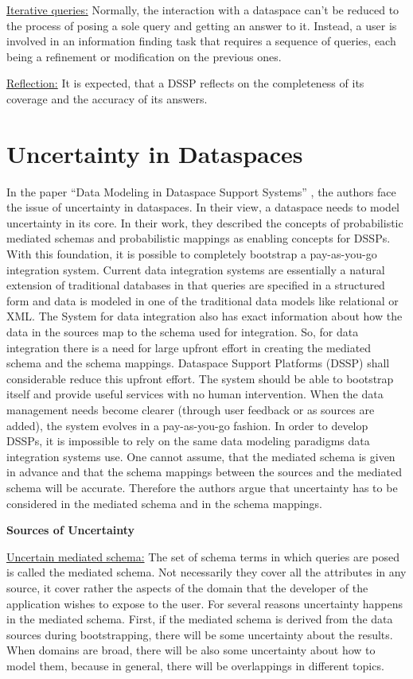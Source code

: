 \uline{Iterative queries:} Normally, the interaction with a dataspace can't be reduced to the process of posing  a sole query and getting an answer to it. Instead, a user is involved in an information finding task that requires a sequence of queries, each being a refinement or modification on the previous ones.

\uline{Reflection:} It is expected, that a DSSP reflects on the completeness of its coverage and the accuracy of its answers. 


\section{Uncertainty in Dataspaces}
 
In the paper ``Data Modeling in Dataspace Support Systems'' \cite{DBLP:conf/birthday/SarmaDH09}, the authors face the issue of uncertainty in dataspaces. In their view, a dataspace needs to model uncertainty in its core. In their work, they described the concepts of probabilistic mediated schemas and probabilistic mappings as enabling concepts for DSSPs. With this foundation, it is possible to completely bootstrap a pay-as-you-go integration system.
Current data integration systems are essentially a natural extension of traditional databases in that queries are specified in a structured form and data is modeled in one of the traditional data models like relational or XML. The System for data integration also has exact information about how the data in the sources map to the schema used for integration. So, for data integration there is a need for large upfront effort in creating the mediated schema and the schema mappings. Dataspace Support Platforms (DSSP) shall considerable reduce this upfront effort. The system should be able to bootstrap itself and provide useful services with no human intervention. When the data management needs become clearer (through user feedback or as sources are added), the system evolves in a pay-as-you-go fashion. 
In order to develop DSSPs, it is impossible to rely on the same data modeling paradigms data integration systems use. One cannot assume, that the mediated schema is given in advance and that the schema mappings between the sources and the mediated schema will be accurate. Therefore the authors argue that uncertainty has to be considered in the mediated schema and in the schema mappings.

\textbf{Sources of Uncertainty}

\uline{Uncertain mediated schema:} The set of schema terms in which queries are posed is called the mediated schema. Not necessarily they cover all the attributes in any source, it cover rather the aspects of the domain that the developer of the application wishes to expose to the user. For several reasons uncertainty happens in the mediated schema. First, if the mediated schema is derived from the data sources during bootstrapping, there will be some uncertainty about the results. When domains are broad, there will be also some uncertainty about how to model them, because in general, there will be overlappings in different topics. 

